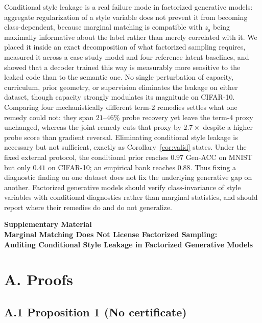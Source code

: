 \documentclass[letterpaper]{article}
\newcommand{\zs}{z_{\mathrm{s}}}
\begin{document}
Conditional style leakage is a real failure mode in factorized generative
models: aggregate regularization of a style variable does not prevent it from
becoming class-dependent, because marginal matching is compatible with $\zs$
being maximally informative about the label rather than merely correlated
with it. We placed it inside an exact decomposition of what factorized
sampling requires, measured it across a case-study model and four reference
latent baselines, and showed that a decoder trained this way is measurably
more sensitive to the leaked code than
to the semantic one. No single perturbation of capacity, curriculum, prior
geometry, or supervision eliminates the leakage on either dataset, though
capacity strongly modulates its magnitude on CIFAR-10. {Comparing four
mechanistically different term-2 remedies settles what one remedy could not:
they span $21$--$46\%$ probe recovery yet leave the term-4 proxy unchanged,
whereas the joint remedy cuts that proxy by $2.7\times$ despite a higher
probe score than gradient reversal. Eliminating conditional style leakage is
necessary but not sufficient, exactly as Corollary~\ref{cor:valid} states.}
Under the fixed external protocol, the conditional prior reaches $0.97$
Gen-ACC on MNIST but only $0.41$ on CIFAR-10; an empirical bank reaches
$0.88$. Thus fixing a diagnostic finding on one dataset does not fix the
underlying generative gap on another. Factorized generative models should
verify class-invariance of style variables with conditional diagnostics
rather than marginal statistics, and should report where their remedies do
and do not generalize.


\clearpage



\clearpage
\begin{center}
{\LARGE\bfseries Supplementary Material\\[0.4em]
Marginal Matching Does Not License Factorized Sampling:\\
Auditing Conditional Style Leakage in Factorized Generative Models\par}
\end{center}

\section{A. Proofs}

\subsection{A.1 Proposition 1 (No certificate)}
\end{document}
